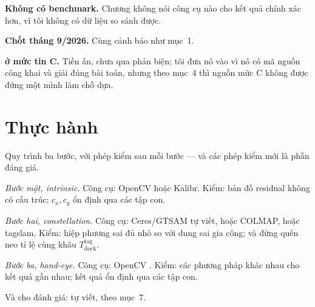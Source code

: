 \documentclass[../../marker.tex]{subfiles}
\begin{document}
\textbf{Không có benchmark.} Chương không nói công cụ nào cho kết quả chính xác hơn, vì tôi không có dữ liệu so sánh được.

\textbf{Chốt tháng 9/2026.} Cùng cảnh báo như  mục~1.

\textbf{ ở mức tin C.} Tiền ấn, chưa qua phản biện; tôi đưa nó vào vì nó có mã nguồn công khai và giải đúng bài toán, nhưng theo  mục~4 thì nguồn mức C không được đứng một mình làm chỗ dựa.

\section{Thực hành}

Quy trình ba bước, với phép kiểm sau mỗi bước --- và các phép kiểm mới là phần đáng giá.

\emph{Bước một, intrinsic.} Công cụ: OpenCV hoặc Kalibr. Kiểm: bản đồ residual không có cấu trúc; \(c_x, c_y\) ổn định qua các tập con.

\emph{Bước hai, constellation.} Công cụ: Ceres/GTSAM tự viết, hoặc COLMAP, hoặc tagslam. Kiểm: hiệp phương sai đủ nhỏ so với dung sai gia công; và đừng quên neo tỉ lệ cùng khâu \(T^{\text{tag}}_{\text{dock}}\).

\emph{Bước ba, hand-eye.} Công cụ: OpenCV . Kiểm: các phương pháp khác nhau cho kết quả gần nhau; kết quả ổn định qua các tập con.

Và cho đánh giá: tự viết, theo  mục~7.
\end{document}

